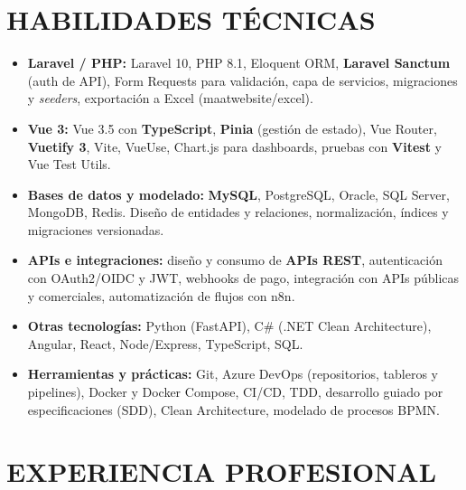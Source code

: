 \documentclass[letterpaper,10pt]{article}
\begin{document}
\section{HABILIDADES TÉCNICAS}
\begin{itemize}
    \item \textbf{Laravel / PHP:} Laravel 10, PHP 8.1, Eloquent ORM, \textbf{Laravel Sanctum} (auth de API), Form Requests para validación, capa de servicios, migraciones y \textit{seeders}, exportación a Excel (maatwebsite/excel).
    \item \textbf{Vue 3:} Vue 3.5 con \textbf{TypeScript}, \textbf{Pinia} (gestión de estado), Vue Router, \textbf{Vuetify 3}, Vite, VueUse, Chart.js para dashboards, pruebas con \textbf{Vitest} y Vue Test Utils.
    \item \textbf{Bases de datos y modelado:} \textbf{MySQL}, PostgreSQL, Oracle, SQL Server, MongoDB, Redis. Diseño de entidades y relaciones, normalización, índices y migraciones versionadas.
    \item \textbf{APIs e integraciones:} diseño y consumo de \textbf{APIs REST}, autenticación con OAuth2/OIDC y JWT, webhooks de pago, integración con APIs públicas y comerciales, automatización de flujos con n8n.
    \item \textbf{Otras tecnologías:} Python (FastAPI), C\# (.NET Clean Architecture), Angular, React, Node/Express, TypeScript, SQL.
    \item \textbf{Herramientas y prácticas:} Git, Azure DevOps (repositorios, tableros y pipelines), Docker y Docker Compose, CI/CD, TDD, desarrollo guiado por especificaciones (SDD), Clean Architecture, modelado de procesos BPMN.
\end{itemize}

\section{EXPERIENCIA PROFESIONAL}
\end{document}
